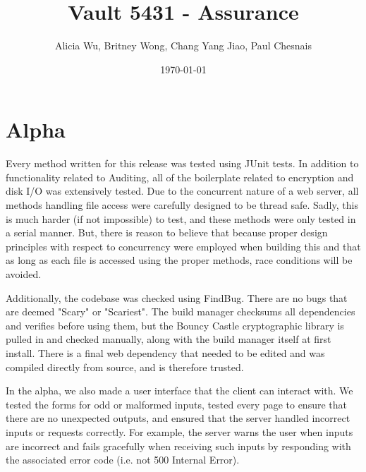 \documentclass{article}
\title{Vault 5431 - Assurance}
\author{Alicia Wu, Britney Wong, Chang Yang Jiao, Paul Chesnais}
\date{\today}
\begin{document}
\maketitle
\thispagestyle{empty}
\section{Alpha}
\par Every method written for this release was tested using JUnit tests. In addition to functionality related to Auditing, all of the boilerplate related to encryption and disk I/O was extensively tested. Due to the concurrent nature of a web server, all methods handling file access were carefully designed to be thread safe. Sadly, this is much harder (if not impossible) to test, and these methods were only tested in a serial manner. But, there is reason to believe that because proper design principles with respect to concurrency were employed when building this and that as long as each file is accessed using the proper methods, race conditions will be avoided.

\par Additionally, the codebase was checked using FindBug. There are no bugs that are deemed "Scary" or "Scariest". The build manager checksums all dependencies and verifies before using them, but the Bouncy Castle cryptographic library is pulled in and checked manually, along with the build manager itself at first install. There is a final web dependency that needed to be edited and was compiled directly from source, and is therefore trusted.

\par In the alpha, we also made a user interface that the client can interact with. We tested the forms for odd or malformed inputs, tested every page to ensure that there are no unexpected outputs, and ensured that the server handled incorrect inputs or requests correctly. For example, the server warns the user when inputs are incorrect and fails gracefully when receiving such inputs by responding with the associated error code (i.e. not 500 Internal Error).
\end{document}
